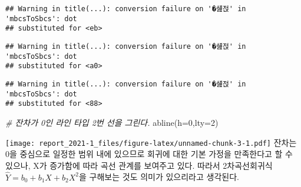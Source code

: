 \documentclass[
]{article}
\newenvironment{Shaded}{\begin{snugshade}}{\end{snugshade}}
\newcommand{\AttributeTok}[1]{\textcolor[rgb]{0.77,0.63,0.00}{#1}}
\newcommand{\CommentTok}[1]{\textcolor[rgb]{0.56,0.35,0.01}{\textit{#1}}}
\newcommand{\DecValTok}[1]{\textcolor[rgb]{0.00,0.00,0.81}{#1}}
\newcommand{\FunctionTok}[1]{\textcolor[rgb]{0.00,0.00,0.00}{#1}}
\newcommand{\NormalTok}[1]{#1}
\newcommand{\OtherTok}[1]{\textcolor[rgb]{0.56,0.35,0.01}{#1}}
\newcommand{\SpecialCharTok}[1]{\textcolor[rgb]{0.00,0.00,0.00}{#1}}
\newcommand{\StringTok}[1]{\textcolor[rgb]{0.31,0.60,0.02}{#1}}
\begin{document}
\begin{verbatim}
## Warning in title(...): conversion failure on '�섎젅' in 'mbcsToSbcs': dot
## substituted for <eb>
\end{verbatim}

\begin{verbatim}
## Warning in title(...): conversion failure on '�섎젅' in 'mbcsToSbcs': dot
## substituted for <a0>
\end{verbatim}

\begin{verbatim}
## Warning in title(...): conversion failure on '�섎젅' in 'mbcsToSbcs': dot
## substituted for <88>
\end{verbatim}

\begin{Shaded}
\begin{Highlighting}[]
\CommentTok{\# 잔차가 0인 라인 타입 2번 선을 그린다.}
\FunctionTok{abline}\NormalTok{(}\AttributeTok{h=}\DecValTok{0}\NormalTok{,}\AttributeTok{lty=}\DecValTok{2}\NormalTok{)}
\end{Highlighting}
\end{Shaded}

\texttt{[image: report\_2021-1\_files/figure-latex/unnamed-chunk-3-1.pdf]}
잔차는 0을 중심으로 일정한 범위 내에 있으므로 회귀에 대한 기본 가정을
만족한다고 할 수 있으나, X가 증가함에 따라 곡선 관계를 보여주고 있다.
따라서 2차곡선회귀식 \(\hat{Y}=b_0+b_1X+b_2X^2\)을 구해보는 것도 의미가
있으리라고 생각된다.

\begin{Shaded}
\end{Shaded}
\end{document}
